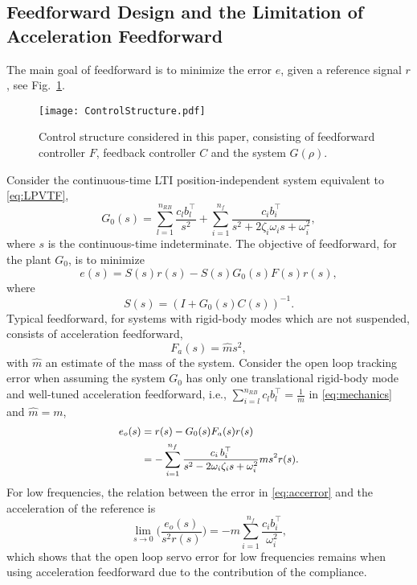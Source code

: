 \documentclass[letterpaper, 10 pt, conference]{ieeeconf}  %
\begin{document}
\subsection{Feedforward Design and the Limitation of Acceleration Feedforward}
The main goal of feedforward is to minimize the error $e$, given a reference signal $r$, see Fig.~\ref{fig:controlLayout}. 
\begin{figure}[tbp]
	\centerline{\texttt{[image: ControlStructure.pdf]}}
	\caption{Control structure considered in this paper, consisting of feedforward controller $F$, feedback controller $C$ and the system $G(\rho)$.}
	\label{fig:controlLayout}
\end{figure}
Consider the continuous-time LTI position-independent system equivalent to \eqref{eq:LPVTF},
\begin{equation}
	\label{eq:mechanics}
	G_0(s)=\sum_{l=1}^{n_{RB}} \frac{c_{l} b_{l}^{\top}}{s^{2}}+\sum_{i=1}^{n_{f}} \frac{c_{i} b_{i}^{\top}}{s^{2}+2 \zeta_{i} \omega_{i} s+\omega_{i}^{2}},
\end{equation}
where $s$ is the continuous-time indeterminate. The objective of feedforward, for the plant $G_0$, is to minimize
\begin{equation*}
	\label{eq:error}
	e(s) = S(s)r(s)-S(s)G_0(s)F(s)r(s),
\end{equation*}
where
\begin{equation*}
	\label{eq:sensitivity}
	S(s) = (I+G_0(s)C(s))^{-1}.
\end{equation*}
Typical feedforward, for systems with rigid-body modes which are not suspended, consists of acceleration feedforward,
\begin{equation}
	\label{eq:accelerationFeedforward}
	{F}_a(s) = \hat{m}s^2,
\end{equation}
with $\hat{m}$ an estimate of the mass of the system. Consider the open loop tracking error when assuming the system $G_0$ has only one translational rigid-body mode and well-tuned acceleration feedforward, i.e., $\sum_{i=l}^{n_{RB}}c_lb_l^\top=\frac{1}{m}$ in \eqref{eq:mechanics} and $\hat{m}=m$,
\begin{equation}
	\label{eq:accerror}
	\small
	\begin{split}
		e_o(s) &= r(s)-G_0(s)F_a(s)r(s) \\
		&= -\sum_{i=1}^{n_f}\frac{c_i\,b_i^\top}{s^2-2\omega_i\zeta_is+\omega_i^2}ms^2r(s).
	\end{split}
\end{equation}
For low frequencies, the relation between the error in \eqref{eq:accerror} and the acceleration of the reference is
\begin{equation}
	\label{eq:complianceError}
	\lim_{s\rightarrow0}\bigg(\frac{e_o(s)}{s^2{r}(s)}\bigg) = -m\sum_{i=1}^{n_f}\frac{ c_{i} b_i^\top}{\omega_i^2},
\end{equation}
which shows that the open loop servo error for low frequencies remains when using acceleration feedforward due to the contribution of the compliance.
\end{document}
